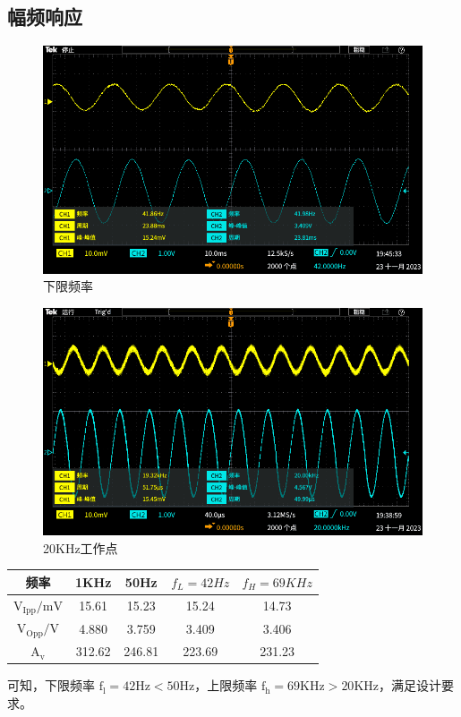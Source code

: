 \documentclass[a4paper]{article}
\theoremstyle{definition}
\theoremstyle{plain}
\theoremstyle{remark}
\begin{document}
\subsection{幅频响应}
\begin{figure}[H]
	\centering
	\includegraphics[width=1\textwidth]{下限频率}
	\caption{下限频率}
	\label{下限频率}
\end{figure}
\begin{figure}[H]
	\centering
	\includegraphics[width=1\textwidth]{20KHz工作点}
	\caption{20KHz工作点}
	\label{20KHz工作点}
\end{figure}
\begin{table}[H]
	\centering
	\large
	\begin{tabular}{|c|c|c|c|c|}
		\hline
		\textbf{频率}           & \textbf{1KHz} & \textbf{50Hz} & \textbf{$f_L =42Hz$} & \textbf{$f_H=69KHz$} \\ \hline
		$\mathrm{V_{Ipp}/mV}$ & 15.61         & 15.23         & 15.24                 & 14.73                \\ \hline
		$\mathrm{V_{Opp}/V}$  & 4.880         & 3.759         & 3.409                 & 3.406                \\ \hline
		$\mathrm{A_v}$        & 312.62        & 246.81        & 223.69                & 231.23               \\ \hline
	\end{tabular}
\end{table}
可知，下限频率 $\mathrm{f_l = 42Hz<50Hz}$，上限频率 $\mathrm{f_h=69KHz>20KHz}$，满足设计要求。
\end{document}
